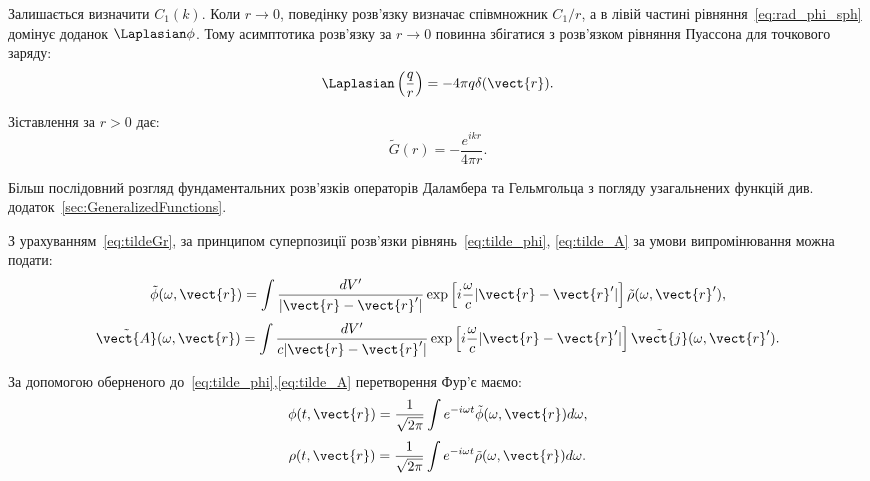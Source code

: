 Залишається визначити $C_1(k)$. Коли $r \to 0$, поведінку розв'язку визначає співмножник $C_1/r$, а в лівій частині
рівняння~\eqref{eq:rad_phi_sph} домінує доданок $\Laplasian \phi$. Тому асимптотика розв'язку за $r \to 0$ повинна збігатися
з розв'язком рівняння Пуассона для точкового заряду:
\begin{equation}
	\Laplasian \left( \frac{q}{r} \right) = -4\pi q \delta (\vect{r}).
\end{equation}

Зіставлення за $r > 0$ дає:
\begin{equation}\label{eq:tildeGr}
	\tilde{G}(r) = - \frac{e^{ikr}}{4\pi r}.
\end{equation}

Більш послідовний розгляд фундаментальних розв'язків операторів Даламбера та Гельмгольца з погляду узагальнених функцій
див. додаток~\ref{sec:GeneralizedFunctions}.

З урахуванням~\eqref{eq:tildeGr}, за принципом суперпозиції розв'язки рівнянь~\eqref{eq:tilde_phi}, \eqref{eq:tilde_A}
за умови випромінювання можна подати:
\begin{equation}\label{eq:tilde_phi_bundle}
	\tilde{\phi} (\omega, \vect{r}) = \int \frac{dV'}{|\vect{r} - \vect{r}'|} \exp \left[ i \frac{\omega}{c} |\vect{r} - \vect{r}'| \right]
	\tilde{\rho} (\omega, \vect{r}'),
\end{equation}
\begin{equation}\label{eq:tilde_A_bundle}
	\tilde{\vect{A}}(\omega, \vect{r}) = \int \frac{dV'}{c|\vect{r} - \vect{r}'|} \exp \left[ i \frac{\omega}{c} |\vect{r} - \vect{r}'| \right]
	\tilde{\vect{j}} (\omega, \vect{r}').
\end{equation}

За допомогою оберненого до~\eqref{eq:tilde_phi},\eqref{eq:tilde_A} перетворення Фур'є маємо:
\begin{equation}
	\phi (t, \vect{r}) = \frac{1}{\sqrt{2\pi}} \int e^{-i\omega t} \tilde{\phi} (\omega, \vect{r}) d\omega,
\end{equation}
\begin{equation}
	\rho (t, \vect{r}) = \frac{1}{\sqrt{2\pi}} \int e^{-i\omega t} \tilde{\rho} (\omega, \vect{r}) d\omega.
\end{equation}


